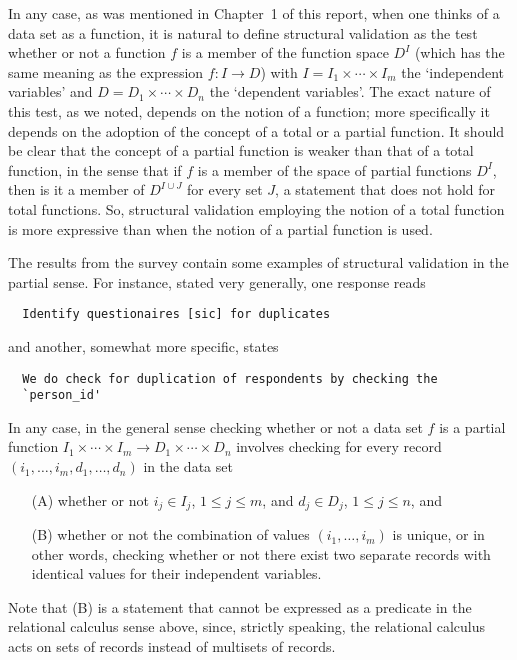 In any case, as was mentioned in Chapter~1 of this report, when one thinks of a data set as a function, it is natural to define structural validation as the test whether or not a function $f$ is a member of the function space $D^I$ (which has the same meaning as the expression $f:I\to D$) with $I=I_1\times\cdots\times I_m$ the `independent variables' and $D=D_1\times\cdots\times D_n$ the `dependent variables'. The exact nature of this test, as we noted, depends on the notion of a function; more specifically it depends on the adoption of the concept of a total or a partial function. It should be clear that the concept of a partial function is weaker than that of a total function, in the sense that if $f$ is a member of the space of partial functions $D^I$, then is it a member of $D^{I\cup J}$ for every set $J$, a statement that does not hold for total functions. So, structural validation employing the notion of a total function is more expressive than when the notion of a partial function is used.

The results from the survey contain some examples of structural validation in the partial sense. For instance, stated very generally, one response reads
\begin{verbatim}
  Identify questionaires [sic] for duplicates
\end{verbatim}
and another, somewhat more specific, states
\begin{verbatim}
  We do check for duplication of respondents by checking the
  `person_id'
\end{verbatim}
In any case, in the general sense checking whether or not a data set $f$ is a partial function $I_1\times\cdots\times I_m\to D_1\times\cdots\times D_n$ involves checking for every record $(i_1,\dots,i_m,d_1,\dots,d_n)$ in the data set
\begin{itemize}
\item[(A)] whether or not $i_j\in I_j$, $1\le j\le m$, and $d_j\in D_j$, $1\le j\le n$, and
\item[(B)] whether or not the combination of values $(i_1,\dots,i_m)$ is unique, or in other words, checking whether or not there exist two separate records with identical values for their independent variables.
\end{itemize}
Note that (B) is a statement that cannot be expressed as a predicate in the relational calculus sense above, since, strictly speaking, the relational calculus acts on sets of records instead of multisets of records.

